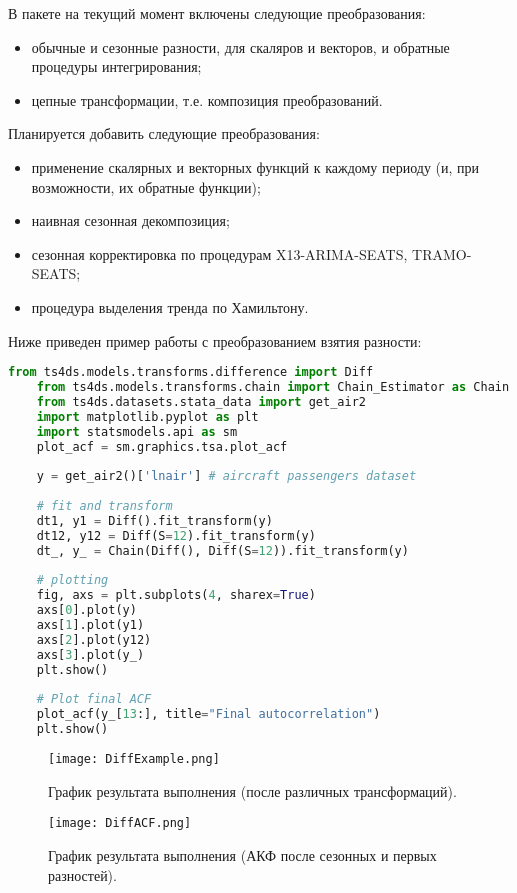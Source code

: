 \documentclass[../report.tex]{subfiles}
\begin{document}
	В пакете на текущий момент включены следующие преобразования:
	\begin{itemize}
		\item обычные и сезонные разности, для скаляров и векторов, и обратные процедуры интегрирования;
		\item цепные трансформации, т.е. композиция преобразований.
	\end{itemize}
	
	Планируется добавить следующие преобразования:
	\begin{itemize}
		\item применение скалярных и векторных функций к каждому периоду (и, при возможности, их обратные функции);
		\item наивная сезонная декомпозиция;
		\item сезонная корректировка по процедурам X13-ARIMA-SEATS, TRAMO-SEATS;
		\item процедура выделения тренда по Хамильтону.
	\end{itemize}
	
	Ниже приведен пример работы с преобразованием взятия разности:
	
	\begin{lstlisting}[language=Python]
	from ts4ds.models.transforms.difference import Diff
	from ts4ds.models.transforms.chain import Chain_Estimator as Chain
	from ts4ds.datasets.stata_data import get_air2
	import matplotlib.pyplot as plt
	import statsmodels.api as sm
	plot_acf = sm.graphics.tsa.plot_acf
	
	y = get_air2()['lnair'] # aircraft passengers dataset
	
	# fit and transform
	dt1, y1 = Diff().fit_transform(y)
	dt12, y12 = Diff(S=12).fit_transform(y)
	dt_, y_ = Chain(Diff(), Diff(S=12)).fit_transform(y)
	
	# plotting
	fig, axs = plt.subplots(4, sharex=True)
	axs[0].plot(y)
	axs[1].plot(y1)
	axs[2].plot(y12)
	axs[3].plot(y_)
	plt.show()
	
	# Plot final ACF
	plot_acf(y_[13:], title="Final autocorrelation")
	plt.show()
	\end{lstlisting}
	
	\begin{figure}
		\texttt{[image: DiffExample.png]}
		\caption{График результата выполнения (после различных трансформаций).}
		\label{fig:ts4ds-diffexample}
	\end{figure}
	\begin{figure}
		\texttt{[image: DiffACF.png]}
		\caption{График результата выполнения (АКФ после сезонных и первых разностей).}
		\label{fig:ts4ds-diffacf}
	\end{figure}
	
\end{document}
